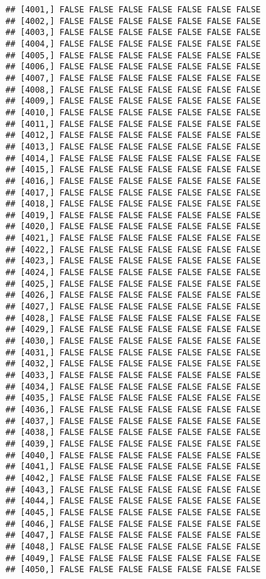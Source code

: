 \documentclass[
]{article}
\begin{document}
\begin{verbatim}
## [4001,] FALSE FALSE FALSE FALSE FALSE FALSE FALSE
## [4002,] FALSE FALSE FALSE FALSE FALSE FALSE FALSE
## [4003,] FALSE FALSE FALSE FALSE FALSE FALSE FALSE
## [4004,] FALSE FALSE FALSE FALSE FALSE FALSE FALSE
## [4005,] FALSE FALSE FALSE FALSE FALSE FALSE FALSE
## [4006,] FALSE FALSE FALSE FALSE FALSE FALSE FALSE
## [4007,] FALSE FALSE FALSE FALSE FALSE FALSE FALSE
## [4008,] FALSE FALSE FALSE FALSE FALSE FALSE FALSE
## [4009,] FALSE FALSE FALSE FALSE FALSE FALSE FALSE
## [4010,] FALSE FALSE FALSE FALSE FALSE FALSE FALSE
## [4011,] FALSE FALSE FALSE FALSE FALSE FALSE FALSE
## [4012,] FALSE FALSE FALSE FALSE FALSE FALSE FALSE
## [4013,] FALSE FALSE FALSE FALSE FALSE FALSE FALSE
## [4014,] FALSE FALSE FALSE FALSE FALSE FALSE FALSE
## [4015,] FALSE FALSE FALSE FALSE FALSE FALSE FALSE
## [4016,] FALSE FALSE FALSE FALSE FALSE FALSE FALSE
## [4017,] FALSE FALSE FALSE FALSE FALSE FALSE FALSE
## [4018,] FALSE FALSE FALSE FALSE FALSE FALSE FALSE
## [4019,] FALSE FALSE FALSE FALSE FALSE FALSE FALSE
## [4020,] FALSE FALSE FALSE FALSE FALSE FALSE FALSE
## [4021,] FALSE FALSE FALSE FALSE FALSE FALSE FALSE
## [4022,] FALSE FALSE FALSE FALSE FALSE FALSE FALSE
## [4023,] FALSE FALSE FALSE FALSE FALSE FALSE FALSE
## [4024,] FALSE FALSE FALSE FALSE FALSE FALSE FALSE
## [4025,] FALSE FALSE FALSE FALSE FALSE FALSE FALSE
## [4026,] FALSE FALSE FALSE FALSE FALSE FALSE FALSE
## [4027,] FALSE FALSE FALSE FALSE FALSE FALSE FALSE
## [4028,] FALSE FALSE FALSE FALSE FALSE FALSE FALSE
## [4029,] FALSE FALSE FALSE FALSE FALSE FALSE FALSE
## [4030,] FALSE FALSE FALSE FALSE FALSE FALSE FALSE
## [4031,] FALSE FALSE FALSE FALSE FALSE FALSE FALSE
## [4032,] FALSE FALSE FALSE FALSE FALSE FALSE FALSE
## [4033,] FALSE FALSE FALSE FALSE FALSE FALSE FALSE
## [4034,] FALSE FALSE FALSE FALSE FALSE FALSE FALSE
## [4035,] FALSE FALSE FALSE FALSE FALSE FALSE FALSE
## [4036,] FALSE FALSE FALSE FALSE FALSE FALSE FALSE
## [4037,] FALSE FALSE FALSE FALSE FALSE FALSE FALSE
## [4038,] FALSE FALSE FALSE FALSE FALSE FALSE FALSE
## [4039,] FALSE FALSE FALSE FALSE FALSE FALSE FALSE
## [4040,] FALSE FALSE FALSE FALSE FALSE FALSE FALSE
## [4041,] FALSE FALSE FALSE FALSE FALSE FALSE FALSE
## [4042,] FALSE FALSE FALSE FALSE FALSE FALSE FALSE
## [4043,] FALSE FALSE FALSE FALSE FALSE FALSE FALSE
## [4044,] FALSE FALSE FALSE FALSE FALSE FALSE FALSE
## [4045,] FALSE FALSE FALSE FALSE FALSE FALSE FALSE
## [4046,] FALSE FALSE FALSE FALSE FALSE FALSE FALSE
## [4047,] FALSE FALSE FALSE FALSE FALSE FALSE FALSE
## [4048,] FALSE FALSE FALSE FALSE FALSE FALSE FALSE
## [4049,] FALSE FALSE FALSE FALSE FALSE FALSE FALSE
## [4050,] FALSE FALSE FALSE FALSE FALSE FALSE FALSE

\end{verbatim}
\end{document}
